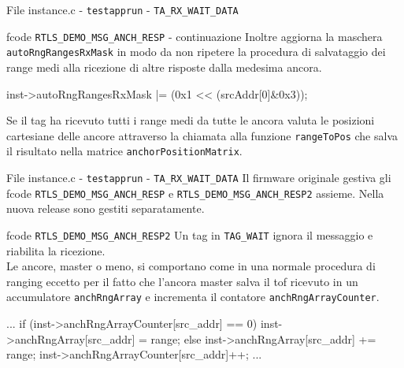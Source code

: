 \begin{frame}[fragile, shrink=15]{File instance.c - \lstinline[language=C]!testapprun! - \lstinline[language=C]!TA_RX_WAIT_DATA!}
  \begin{block}{fcode \lstinline[language=C]!RTLS_DEMO_MSG_ANCH_RESP! - continuazione}
    Inoltre aggiorna la maschera \lstinline[language=C]!autoRngRangesRxMask! in modo da non ripetere
    la procedura di salvataggio dei range medi alla ricezione di altre risposte dalla medesima ancora.
    \begin{C}
        inst->autoRngRangesRxMask |= (0x1 << (srcAddr[0]&0x3));
    \end{C}
    Se il tag ha ricevuto tutti i range medi da tutte le ancora valuta le posizioni cartesiane
    delle ancore attraverso la chiamata alla funzione \lstinline[language=C]!rangeToPos! che salva il risultato
    nella matrice \lstinline[language=C]!anchorPositionMatrix!.
    \begin{C}
        if (inst->autoRngRangesRxMask  == (0x1 << MAX_ANCHOR_LIST_SIZE) - 1)
        {
          rangesToPos(inst->autoRngRangesArray,\
          inst->anchorPositionMatrix);
        }
      }
      ...
    \end{C}
  \end{block}
\end{frame}

\begin{frame}[fragile, shrink=15]{File instance.c - \lstinline[language=C]!testapprun! - \lstinline[language=C]!TA_RX_WAIT_DATA!}
  Il firmware originale gestiva gli fcode \lstinline[language=C]!RTLS_DEMO_MSG_ANCH_RESP! e
  \lstinline[language=C]!RTLS_DEMO_MSG_ANCH_RESP2! assieme. Nella nuova release sono gestiti separatamente.
  \begin{block}{fcode \lstinline[language=C]!RTLS_DEMO_MSG_ANCH_RESP2!}
    Un tag in \lstinline[language=C]!TAG_WAIT! ignora il messaggio e riabilita la ricezione.\\
    Le ancore, master o meno, si comportano come in una normale procedura di ranging
    eccetto per il fatto che l'ancora master salva il tof ricevuto in un accumulatore
    \lstinline[language=C]!anchRngArray! e incrementa il contatore \lstinline[language=C]!anchRngArrayCounter!.
    \begin{C}
      ...
      if (inst->anchRngArrayCounter[src_addr] == 0)
        inst->anchRngArray[src_addr] = range;
      else 
        inst->anchRngArray[src_addr] += range;
      inst->anchRngArrayCounter[src_addr]++;
      ...
    \end{C}
  \end{block}
\end{frame}

